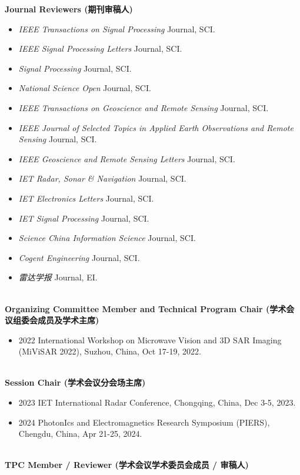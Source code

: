 \documentclass[paper=a4,fontsize=11pt]{scrartcl}
\begin{document}
\textbf{Journal Reviewers (期刊审稿人)} 
\begin{itemize}
	\item \textit{IEEE Transactions on Signal Processing} Journal, SCI.
	\item \textit{IEEE Signal Processing Letters} Journal, SCI.
	\item \textit{Signal Processing} Journal, SCI.
	\item \textit{National Science Open} Journal, SCI.
	\item \textit{IEEE Transactions on Geoscience and Remote Sensing} Journal, SCI.
	\item \textit{IEEE Journal of Selected Topics in Applied Earth Observations and Remote Sensing} Journal, SCI.
	\item \textit{IEEE Geoscience and Remote Sensing Letters} Journal, SCI.
	\item \textit{IET Radar, Sonar \& Navigation} Journal, SCI.
	\item \textit{IET Electronics Letters} Journal, SCI.
	\item \textit{IET Signal Processing} Journal, SCI.
	\item \textit{Science China Information Science} Journal, SCI.
	\item \textit{Cogent Engineering} Journal, SCI.
	\item \textit{雷达学报} Journal, EI.
\end{itemize}
~\\
\textbf{Organizing Committee Member and Technical Program Chair (学术会议组委会成员及学术主席)} 
\begin{itemize}
	\item 2022 International Workshop on Microwave Vision and 3D SAR Imaging (MiViSAR 2022), Suzhou, China, Oct 17-19, 2022.
\end{itemize}
~\\
\textbf{Session Chair (学术会议分会场主席)} 
\begin{itemize}
	\item 2023 IET International Radar Conference, Chongqing, China, Dec 3-5, 2023.
	\item 2024 PhotonIcs and Electromagnetics Research Symposium (PIERS), Chengdu, China, Apr 21-25, 2024.
\end{itemize}
~\\
\textbf{TPC Member / Reviewer (学术会议学术委员会成员 / 审稿人)} 
\end{document}
